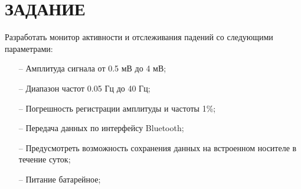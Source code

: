 \begin{sloppypar} %
\newpage %
\section*{ЗАДАНИЕ} %

Разработать монитор активности и отслеживания падений  со следующими параметрами: 
\begin{itemize}
	\item[--]Амплитуда сигнала от 0.5 мВ до 4 мВ;
	\item[--]Диапазон частот 0.05 Гц до 40 Гц;
	\item[--]Погрешность регистрации амплитуды и частоты 1\%;
	\item[--]Передача данных по интерфейсу Bluetooth;
	\item[--]Предусмотреть возможность сохранения данных на встроенном носителе в течение суток;
	\item[--]Питание батарейное;
\end{itemize}
\end{sloppypar}